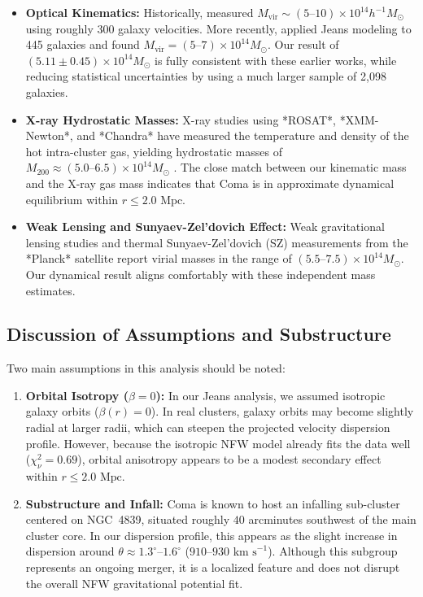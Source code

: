 \documentclass[twocolumn]{aastex631}
\begin{document}
\begin{itemize}
	\item \textbf{Optical Kinematics:} Historically, \citet{kent1982} measured $M_{\text{vir}} \sim (5\text{--}10) \times 10^{14} h^{-1} M_\odot$ using roughly 300 galaxy velocities. More recently, \citet{lokas2003} applied Jeans modeling to 445 galaxies and found $M_{\text{vir}} = (5\text{--}7) \times 10^{14} M_\odot$. Our result of $(5.11 \pm 0.45) \times 10^{14} M_\odot$ is fully consistent with these earlier works, while reducing statistical uncertainties by using a much larger sample of 2,098 galaxies.

	\item \textbf{X-ray Hydrostatic Masses:} X-ray studies using *ROSAT*, *XMM-Newton*, and *Chandra* have measured the temperature and density of the hot intra-cluster gas, yielding hydrostatic masses of $M_{200} \approx (5.0\text{--}6.5) \times 10^{14} M_\odot$ \citep[e.g.,][]{reiprich2002, falco2014}. The close match between our kinematic mass and the X-ray gas mass indicates that Coma is in approximate dynamical equilibrium within $r \le 2.0\text{ Mpc}$.

	\item \textbf{Weak Lensing and Sunyaev-Zel'dovich Effect:} Weak gravitational lensing studies \citep[e.g.,][]{okabe2010} and thermal Sunyaev-Zel'dovich (SZ) measurements from the *Planck* satellite \citep{planck2014} report virial masses in the range of $(5.5\text{--}7.5) \times 10^{14} M_\odot$. Our dynamical result aligns comfortably with these independent mass estimates.
\end{itemize}

\subsection{Discussion of Assumptions and Substructure}
Two main assumptions in this analysis should be noted:
\begin{enumerate}
	\item \textbf{Orbital Isotropy ($\beta = 0$):} In our Jeans analysis, we assumed isotropic galaxy orbits ($\beta(r) = 0$). In real clusters, galaxy orbits may become slightly radial at larger radii, which can steepen the projected velocity dispersion profile. However, because the isotropic NFW model already fits the data well ($\chi_\nu^2 = 0.69$), orbital anisotropy appears to be a modest secondary effect within $r \le 2.0\text{ Mpc}$.
	\item \textbf{Substructure and Infall:} Coma is known to host an infalling sub-cluster centered on NGC~4839, situated roughly $40$ arcminutes southwest of the main cluster core. In our dispersion profile, this appears as the slight increase in dispersion around $\theta \approx 1.3^\circ\text{--}1.6^\circ$ ($910\text{--}930\text{ km s}^{-1}$). Although this subgroup represents an ongoing merger, it is a localized feature and does not disrupt the overall NFW gravitational potential fit.
\end{enumerate}
\end{document}
